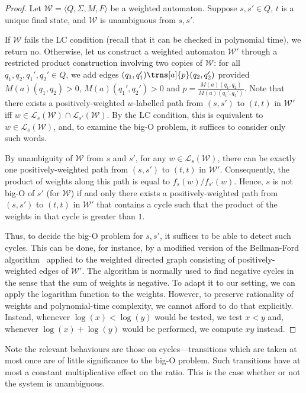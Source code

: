 \documentclass[10pt,a4paper]{amsart}
\numberwithin{equation}{section}
\theoremstyle{plain}
\theoremstyle{definition}
\theoremstyle{remark}
\newcommand\abra[1]{\langle #1 \rangle}
\newcommand\lng[2]{\mathcal{L}_{#1}(#2)}
\newcommand\wa{\mathcal{W}}
\renewcommand\nu{f}
\begin{document}
\begin{proof}
Let $\wa=\abra{Q, \Sigma{}, M, F}$ be a weighted automaton.
Suppose $s,s'\in Q$, $t$ is a unique final state, and $\wa$ is unambiguous from $s, s'$.

If $\wa$ fails the LC condition (recall that it can be checked in polynomial time), we return {no}. Otherwise,
let us construct a weighted automaton  $\wa'$  through a restricted product construction involving two copies of $\wa$:
for all $q_1, q_2, q_1', q_2'\in Q$, we add edges $(q_1,q_1') \trns[a]{p} (q_2,q_2')$ provided
$M(a)(q_1,q_2)>0$, $M(a)(q_1',q_2')>0$ and $p=\frac{M(a)(q_1,q_2)}{M(a)(q_1',q_2')}$.
Note that there exists a positively-weighted $w$-labelled path from $(s,s')$ to $(t,t)$ in $\wa'$
iff $w\in \lng{s}{\wa}\cap \lng{s'}{\wa}$. By the LC condition, this is equivalent to $w\in \lng{s}{\wa}$,
and, to examine the big-O problem, it suffices to consider only such words.

By unambiguity of $\wa$ from $s$ and $s'$, for any $w\in  \lng{s}{\wa}$, there can be exactly one positively-weighted path from $(s,s')$ to $(t,t)$ in $\wa'$.
Consequently, the product of weights along this path is equal to $\nu_s(w)/\nu_{s'}(w)$.
Hence,  $s$ is not big-O of $s'$ (for $\wa$) if and only there exists a positively-weighted path from $(s,s')$ to $(t,t)$ in $\wa'$
that contains a cycle such that the product of the weights in that cycle is greater than $1$.

Thus, to decide the big-O problem for $s,s'$, it suffices to be able to detect such cycles.
This can be done, for instance, by a modified version of
the Bellman-Ford algorithm~\cite{CLR90} applied to the weighted directed graph consisting of positively-weighted edges of $\wa'$.
The algorithm is normally used to find negative cycles in the sense that the sum of weights is negative.
To adapt it to our setting, we can apply the logarithm function to the weights.
However, to preserve rationality of weights and polynomial-time complexity,
we cannot afford to do that explicitly. Instead, whenever $\log(x)<\log(y)$ would be tested, we test $x<y$ and, whenever $\log(x)+\log(y)$ would be performed,
we compute $xy$ instead.
\end{proof}

Note the relevant behaviours are those on cycles---transitions which are taken at most once are of little significance to the big-O problem.
Such transitions have at most a constant multiplicative effect on the ratio. This is the case whether or not the system is unambiguous.
\end{document}
